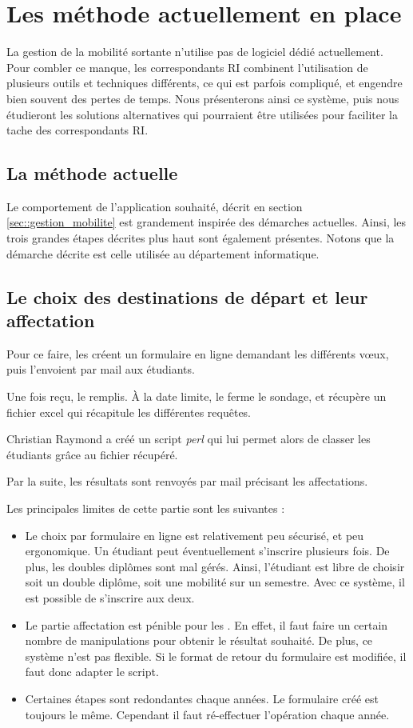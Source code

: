 
		\section{Les méthode actuellement en place}
	

La gestion de la mobilité sortante n'utilise pas de logiciel dédié actuellement. Pour combler ce manque, les correspondants RI combinent l'utilisation de plusieurs outils et techniques différents, ce qui est parfois compliqué, et engendre bien souvent des pertes de temps. Nous présenterons ainsi ce système, puis nous étudieront  les solutions alternatives qui pourraient être utilisées pour faciliter la tache des correspondants RI. 

\subsection{La méthode actuelle}

Le comportement de l'application souhaité, décrit en section \ref{sec::gestion_mobilite} est grandement inspirée des démarches actuelles. Ainsi, les trois grandes étapes décrites plus haut sont également présentes. Notons que la démarche décrite est celle utilisée au département informatique.  
 \subsection{Le choix des destinations de départ et leur affectation}
		 
		Pour ce faire, les \ris créent un formulaire en ligne demandant les différents vœux, puis l'envoient par mail aux étudiants. 
		
		Une fois reçu, le remplis. À la date limite, le \ri ferme le sondage, et récupère un fichier excel qui récapitule les différentes requêtes. 
		
		Christian Raymond a créé un script \textit{perl} qui lui permet alors de classer les étudiants grâce au fichier récupéré.
		
		Par la suite, les résultats sont renvoyés par mail précisant les affectations. 
		
		\medbreak
		
		Les principales limites de cette partie sont les suivantes : 
		\begin{itemize}
		\item Le choix par formulaire en ligne est relativement peu sécurisé, et peu ergonomique. Un étudiant peut  éventuellement s'inscrire plusieurs fois. De plus, les doubles diplômes sont mal gérés. Ainsi, l'étudiant est libre de choisir soit un double diplôme, soit une mobilité sur un semestre. Avec ce système, il est possible de s'inscrire aux deux. 
		\item Le partie affectation est pénible pour les \ris. En effet, il faut faire un certain nombre de manipulations pour obtenir le résultat  souhaité. De plus, ce système n'est pas flexible. Si le format de retour du formulaire est modifiée, il faut donc adapter le script. 
		\item Certaines étapes sont redondantes chaque années. Le formulaire créé est toujours le même. Cependant il faut ré-effectuer l'opération chaque année. 
		\end{itemize}
